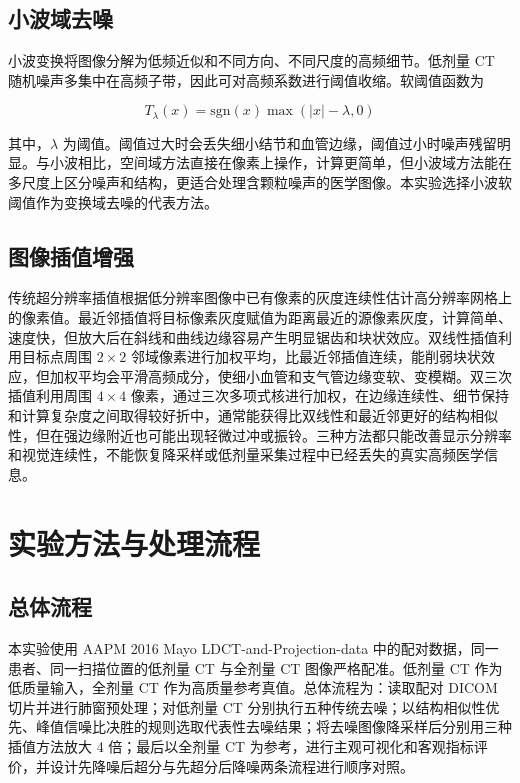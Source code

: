 \documentclass[10.5pt,compsoc,UTF8]{CjC}
\theoremstyle{mystyle}
\begin{document}
\subsection{小波域去噪}

小波变换将图像分解为低频近似和不同方向、不同尺度的高频细节。低剂量 CT 随机噪声多集中在高频子带，因此可对高频系数进行阈值收缩。软阈值函数为

\begin{equation}
T_{\lambda}(x)=\mathrm{sgn}(x)\max(|x|-\lambda,0)
\label{eq:soft-threshold}
\end{equation}

其中，$\lambda$ 为阈值。阈值过大时会丢失细小结节和血管边缘，阈值过小时噪声残留明显。与小波相比，空间域方法直接在像素上操作，计算更简单，但小波域方法能在多尺度上区分噪声和结构，更适合处理含颗粒噪声的医学图像。本实验选择小波软阈值作为变换域去噪的代表方法。

\subsection{图像插值增强}

传统超分辨率插值根据低分辨率图像中已有像素的灰度连续性估计高分辨率网格上的像素值。最近邻插值将目标像素灰度赋值为距离最近的源像素灰度，计算简单、速度快，但放大后在斜线和曲线边缘容易产生明显锯齿和块状效应。双线性插值利用目标点周围 \(2\times2\) 邻域像素进行加权平均，比最近邻插值连续，能削弱块状效应，但加权平均会平滑高频成分，使细小血管和支气管边缘变软、变模糊。双三次插值利用周围 \(4\times4\) 像素，通过三次多项式核进行加权，在边缘连续性、细节保持和计算复杂度之间取得较好折中，通常能获得比双线性和最近邻更好的结构相似性，但在强边缘附近也可能出现轻微过冲或振铃。三种方法都只能改善显示分辨率和视觉连续性，不能恢复降采样或低剂量采集过程中已经丢失的真实高频医学信息。\section{\heiti 实验方法与处理流程}
\subsection{总体流程}

本实验使用 AAPM 2016 Mayo LDCT-and-Projection-data 中的配对数据，同一患者、同一扫描位置的低剂量 CT 与全剂量 CT 图像严格配准。低剂量 CT 作为低质量输入，全剂量 CT 作为高质量参考真值。总体流程为：读取配对 DICOM 切片并进行肺窗预处理；对低剂量 CT 分别执行五种传统去噪；以结构相似性优先、峰值信噪比决胜的规则选取代表性去噪结果；将去噪图像降采样后分别用三种插值方法放大 4 倍；最后以全剂量 CT 为参考，进行主观可视化和客观指标评价，并设计先降噪后超分与先超分后降噪两条流程进行顺序对照。
\end{document}
